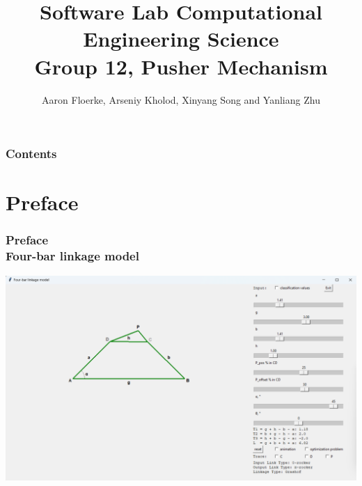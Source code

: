 \documentclass[ucs,10pt]{beamer}
\begin{document}
\title[{\tt info@stce.rwth-aachen.de}]{\textcolor{rwth-blue}{Software Lab Computational Engineering Science} \vspace{.2cm} \\ {\small Group 12, Pusher Mechanism}}
\author[Group 12, Pusher Mechanism]{Aaron Floerke, Arseniy Kholod, Xinyang Song and Yanliang Zhu} 
\date[]{}

\begin{frame}[plain]
\titlepage
\end{frame}

\begin{frame}
	\frametitle{Contents}
	\vspace*{2mm}
	\tableofcontents
\end{frame}

\section{Preface}

\begin{frame}
\frametitle{Preface \\
	\small \color{rwth-blue} Four-bar linkage model}
	\begin{center}
		\includegraphics[width=\linewidth]{./Figures/GUI_screen.png}
	\end{center}
\end{frame}
%	
	
\end{document}
